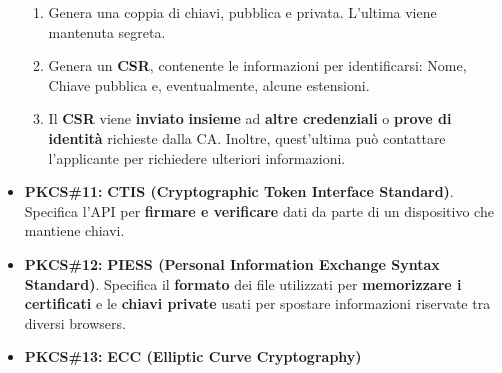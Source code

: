 \begin{itemize}
\begin{proposition}
    \begin{enumerate}
        \item Genera una coppia di chiavi, pubblica e privata. L'ultima viene mantenuta segreta.
        \item Genera un \textbf{CSR}, contenente le informazioni per identificarsi: Nome, Chiave pubblica e, eventualmente, alcune estensioni.
        \item Il \textbf{CSR} viene \textbf{inviato} \textbf{insieme} ad \textbf{altre credenziali} o \textbf{prove di identità} richieste dalla CA. Inoltre, quest'ultima può contattare l'applicante per richiedere ulteriori informazioni.
    \end{enumerate}
    \end{proposition}
    \item \textbf{PKCS\#11:} \textbf{CTIS (Cryptographic Token Interface Standard)}. Specifica l'API per \textbf{firmare e verificare} dati da parte di un dispositivo che mantiene chiavi.
    \item \textbf{PKCS\#12:} \textbf{PIESS (Personal Information Exchange Syntax Standard)}. Specifica il \textbf{formato} dei file utilizzati per \textbf{memorizzare i certificati} e le \textbf{chiavi private} usati per spostare informazioni riservate tra diversi browsers.
    \item \textbf{PKCS\#13:} \textbf{ECC (Elliptic Curve Cryptography)}
\end{itemize}

